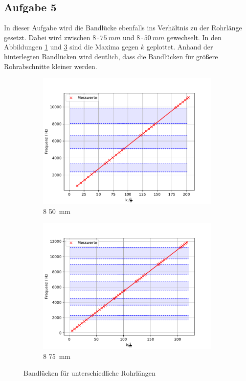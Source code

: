 \subsection{Aufgabe 5}
In dieser Aufgabe wird die Bandlücke ebenfalls ins Verhältnis zu der Rohrlänge gesetzt. Dabei wird zwischen $8 \cdot \SI{75}{mm}$ und $8 \cdot \SI{50}{mm}$ gewechselt.
In den Abbildungen \ref{fig.Aufgabe5} und \ref{fig.Aufgabe575} sind die Maxima gegen $k$ geplottet. Anhand der hinterlegten Bandlücken wird deutlich, dass die Bandlücken für größere Rohrabschnitte kleiner werden.

\begin{figure}
 \centering
 \begin{subfigure}{0.48\textwidth}
  \centering
  \includegraphics[width=1\textwidth]{bla.pdf}
  \caption{8 \cdot \SI{50}{mm}}
  \label{fig.Aufgabe5}
 \end{subfigure}
 \begin{subfigure}{0.48\textwidth}
  \centering
  \includegraphics[width=1\textwidth]{bla75.pdf}
  \caption{8 \cdot \SI{75}{mm}}
  \label{fig.Aufgabe575}
 \end{subfigure}
 \caption{Bandlücken für unterschiedliche Rohrlängen}
\end{figure}
